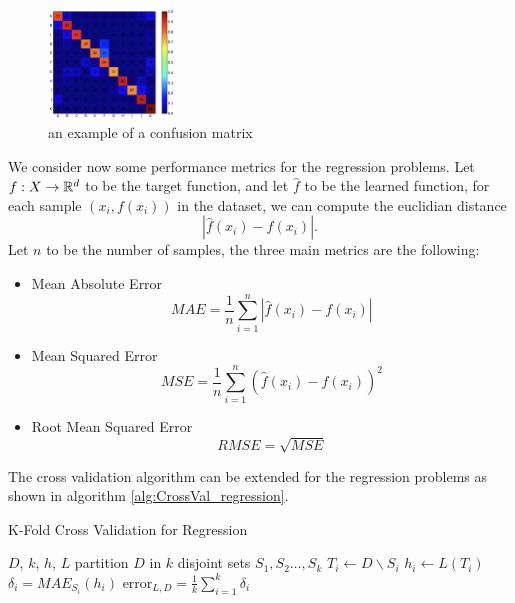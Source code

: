 \documentclass[10pt, letterpaper]{report}
\begin{document}
\bigskip
\begin{figure}[h!]
	\centering
	\includegraphics[width=0.3\textwidth]{images/conf_matrix.png}
	\caption{an example of a confusion matrix}
	\label{img:conf_matrix}
\end{figure}\bigskip

We consider now some performance metrics for the regression problems. Let $f:X\rightarrow{\mathbb R}^d$ to be the target function, and let $\hat f$ to be the learned function, for each sample $(x_i,f(x_i))$ in the dataset, we can compute the euclidian distance\begin{equation}
	|\hat f(x_i)-f(x_i)|.
\end{equation}
Let $n$ to be the number of samples, the three main metrics are the following:\begin{itemize}
	\item Mean Absolute Error\begin{equation}
		      MAE=\frac{1}{n}\sum_{i=1}^n|\hat f(x_i)-f(x_i)|
	      \end{equation}
	\item Mean Squared Error\begin{equation}
		      MSE=\frac{1}{n}\sum_{i=1}^n(\hat f(x_i)-f(x_i))^2
	      \end{equation}
	\item Root Mean Squared Error\begin{equation}
		      RMSE=\sqrt{MSE}
	      \end{equation}
\end{itemize}

The cross validation algorithm can be extended for the regression problems as shown in algorithm \ref{alg:CrossVal_regression}.

\begin{algorithm}
	\caption{K-Fold Cross Validation for Regression}\label{alg:CrossVal_regression}
	\begin{algorithmic}
		\Require $D$, $k$, $h$, $L$
		\State partition $D$ in $k$ disjoint sets $S_1,S_2\dots, S_k$
		\State $T_i\leftarrow  D\backslash S_i$
		\State $h_i\leftarrow L(T_i) $
		\State $\delta_i = MAE_{S_i}(h_i)$
		\EndFor
		\State\Return $\text{error}_{L,D}=\displaystyle\frac{1}{k}\sum_{i=1}^k\delta_i$
	\end{algorithmic}
\end{algorithm}
\end{document}
